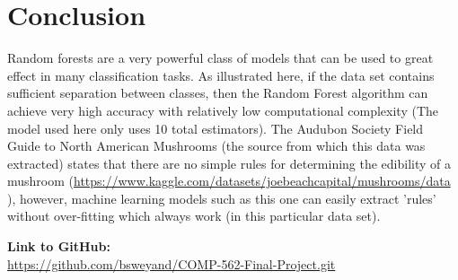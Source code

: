 \documentclass[]{article}
\begin{document}
\newpage
\section{Conclusion}
Random forests are a very powerful class of models that can be used to great effect in many classification tasks. As illustrated here, if the data set contains sufficient separation between classes, then the Random Forest algorithm can achieve very high accuracy with relatively low computational complexity (The model used here only uses 10 total estimators). The Audubon Society Field Guide to North American Mushrooms (the source from which this data was extracted) states that there are no simple rules for determining the edibility of a mushroom (\url{https://www.kaggle.com/datasets/joebeachcapital/mushrooms/data}{ }), however, machine learning models such as this one can easily extract 'rules' without over-fitting which always work (in this particular data set).


\medskip


\textbf{Link to GitHub:} \\
\url{https://github.com/bsweyand/COMP-562-Final-Project.git}
\end{document}
